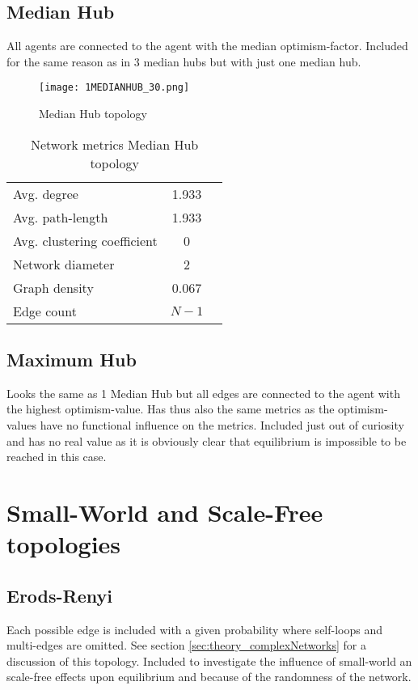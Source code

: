 \documentclass[Bachelorarbeit.tex]{subfiles}
\begin{document}
\subsection{Median Hub}
All agents are connected to the agent with the median optimism-factor.
\medskip
Included for the same reason as in 3 median hubs but with just one median hub.

\begin{figure}[H]
	\centering
  \texttt{[image: 1MEDIANHUB\_30.png]}
	\caption{Median Hub topology}
	\label{fig:topology_1MEDIANHUB_30}
\end{figure}

\begin{table}[h]
	\centering
	\caption{Network metrics Median Hub topology}
	\begin{tabular} { l c r }
		\hline
		Avg. degree & 1.933 \\
		Avg. path-length & 1.933 \\
		Avg. clustering coefficient & 0 \\
		Network diameter & 2 \\
		Graph density & 0.067 \\
		Edge count & $N-1$ \\
		\hline
	\end{tabular}
\end{table}

\subsection{Maximum Hub}
Looks the same as 1 Median Hub but all edges are connected to the agent with the highest optimism-value. Has thus also the same metrics as the optimism-values have no functional influence on the metrics.
\medskip
Included just out of curiosity and has no real value as it is obviously clear that equilibrium is impossible to be reached in this case.

\section{Small-World and Scale-Free topologies}
\subsection{Erods-Renyi}
Each possible edge is included with a given probability where self-loops and multi-edges are omitted. See section \ref{sec:theory_complexNetworks} for a discussion of this topology.
\medskip
Included to investigate the influence of small-world an scale-free effects upon equilibrium and because of the randomness of the network.
\end{document}
